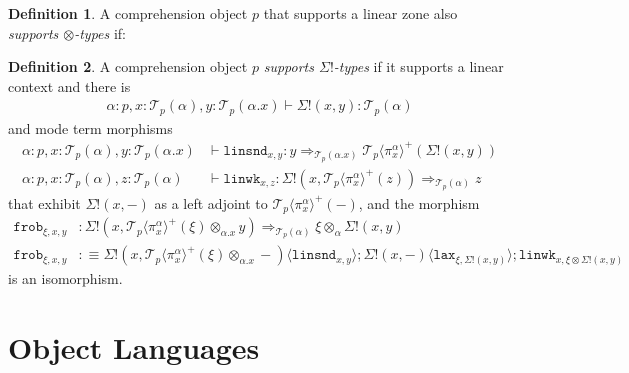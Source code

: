\documentclass[10pt]{article}
\theoremstyle{definition}
\newtheorem{definition}{Definition}
\newcommand{\yields}{\vdash}
\newcommand{\tcell}{\Rightarrow}
\newcommand\TrPlus[2]{\ensuremath{{#1}^+(#2)}}
\newcommand\El[2]{\mathcal{T}_{#1}(#2)}
\newcommand\ApEl[2]{\mathcal{T}_{#1}\langle#2\rangle}
\newcommand\ap[2]{\ensuremath{#1 \langle #2 \rangle }}
\newcommand{\linsnd}[1]{\mathtt{linsnd}_{#1}}
\newcommand{\linwk}[1]{\mathtt{linwk}_{#1}}
\newcommand{\frob}[1]{\mathtt{frob}_{#1}}
\begin{document}
\begin{definition}
A comprehension object $p$ that supports a linear zone also \emph{supports $\otimes$-types} if:
\end{definition}

\begin{definition}
A comprehension object $p$ \emph{supports $\Sigma!$-types} if it supports a linear context and there is
\begin{align*}
\alpha : p, x : \El{p}{\alpha}, y : \El{p}{\alpha.x} \yields \Sigma!(x,y) : \El{p}{\alpha}
\end{align*}
and mode term morphisms
\begin{align*}
\alpha : p, x : \El{p}{\alpha}, y : \El{p}{\alpha.x} &\yields \linsnd{x,y} : y \tcell_{\El{p}{\alpha.x}} \TrPlus{\ApEl{p}{\pi^\alpha_x}}{\Sigma!(x,y)} \\
\alpha : p, x : \El{p}{\alpha}, z : \El{p}{\alpha} &\yields \linwk{x,z} : \Sigma!(x, \TrPlus{\ApEl{p}{\pi^\alpha_x}}{z}) \tcell_{\El{p}{\alpha}} z
\end{align*}
that exhibit $\Sigma!(x,-)$ as a left adjoint to $\TrPlus{\ApEl{p}{\pi^\alpha_x}}{-}$, and the morphism
\begin{align*}
\frob{\xi, x, y} &: \Sigma!(x, \TrPlus{\ApEl{p}{\pi^\alpha_x}}{\xi} \otimes_{\alpha.x} y) \tcell_{\El{p}{\alpha}} \xi \otimes_\alpha \Sigma!(x, y) \\
\frob{\xi, x, y} &:\equiv \ap{\Sigma!(x, \TrPlus{\ApEl{p}{\pi^\alpha_x}}{\xi} \otimes_{\alpha.x} -)}{\linsnd{x,y}} ; \ap{\Sigma!(x, -)}{\mathtt{lax}_{\xi, \Sigma!(x,y)}} ; \linwk{x, \xi \otimes \Sigma!(x,y)}
\end{align*}
is an isomorphism.
\end{definition}

\section{Object Languages}
\end{document}
